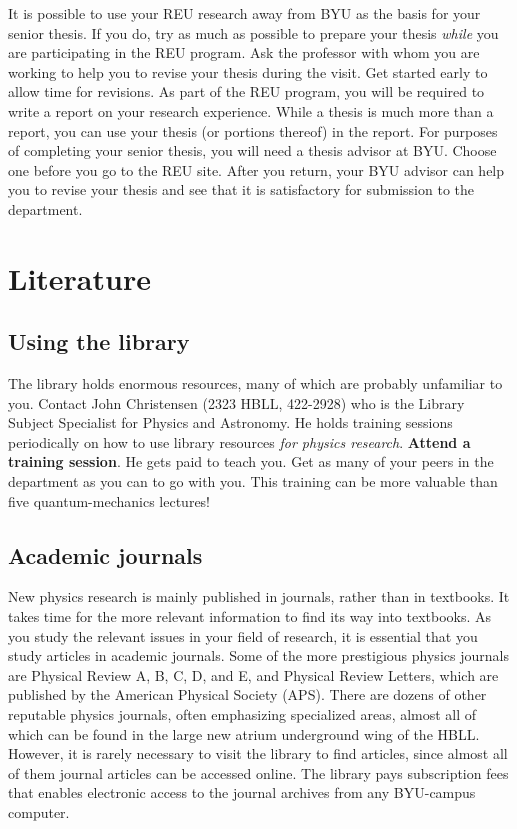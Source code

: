It is possible to use your REU research away from BYU as the basis
for your senior thesis. If you do, try as much as possible to
prepare your thesis \emph{while} you are participating in the REU
program. Ask the professor with whom you are working to help you to
revise your thesis during the visit. Get started early to allow time
for revisions. As part of the REU program, you will be required to
write a report on your research experience. While a thesis is much
more than a report, you can use your thesis (or portions thereof) in
the report. For purposes of completing your senior thesis, you will
need a thesis advisor at BYU. Choose one before you go to the REU
site. After you return, your BYU advisor can help you to revise your
thesis and see that it is satisfactory for submission to the
department.

\section{Literature}
\label{sec:Literature}
\subsection{Using the library}
\label{ssec:UsingLibrary} 

The library holds enormous resources, many of which are probably
unfamiliar to you. Contact John Christensen (2323 HBLL, 422-2928)
who is the Library Subject Specialist for Physics and Astronomy. He
holds training sessions periodically on how to use library resources
\emph{for physics research}. \textbf{Attend a training session}. He
gets paid to teach you. Get as many of your peers in the department
as you can to go with you. This training can be more valuable
than five quantum-mechanics lectures!

\subsection{Academic journals}
\label{ssec:AcademicJournals} 

New physics research is mainly published in journals, rather than in
textbooks. It takes time for the more relevant information to find
its way into textbooks. As you study the relevant issues in your
field of research, it is essential that you study articles in
academic journals. Some of the more prestigious physics journals are
Physical Review A, B, C, D, and E, and Physical Review Letters,
which are published by the American Physical Society (APS). There
are dozens of other reputable physics journals, often emphasizing
specialized areas, almost all of which can be found in the large new
atrium underground wing of the HBLL. However, it is rarely necessary
to visit the library to find articles, since almost all of them
journal articles can be accessed online. The library pays
subscription fees that enables electronic access to the journal
archives from any BYU-campus computer.

